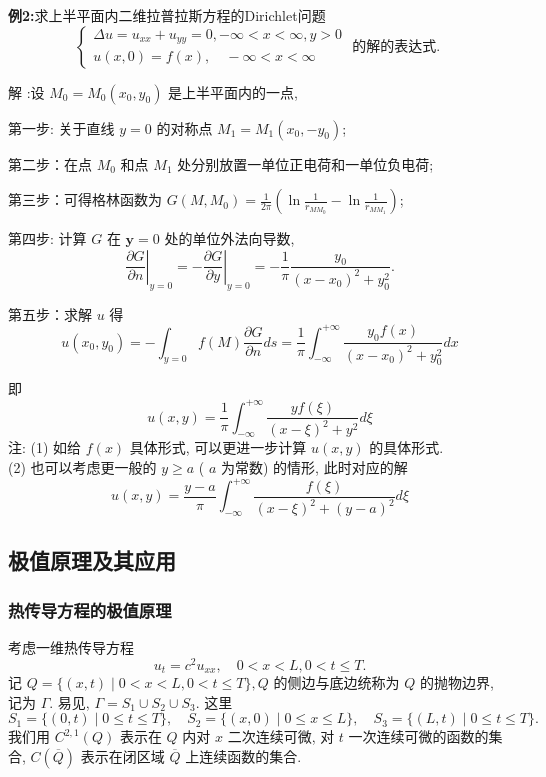 \textbf{例2:}求上半平面内二维拉普拉斯方程的Dirichlet问题
$$
\left\{\begin{array}{c}
\Delta u=u_{x x}+u_{y y}=0,-\infty<x<\infty, y>0 \\
{u}({x}, {0})={f}({x}), \quad-\infty<x<\infty
\end{array}\right. \text { 的解的表达式. }
$$

解 :设 $ M_{0}=M_{0}\left(x_{0}, y_{0}\right) $ 是上半平面内的一点,

第一步: 关于直线 $ y=0 $ 的对称点 $ M_{1}=M_{1}\left(x_{0},-y_{0}\right) $;

第二步：在点 $ M_{0} $ 和点 $ M_{1} $ 处分别放置一单位正电荷和一单位负电荷;

第三步：可得格林函数为 $ G\left(M, M_{0}\right)=\frac{1}{2 \pi}\left(\ln \frac{1}{r_{M M_{0}}}-\ln \frac{1}{r_{M M_{1}}}\right) $;

第四步: 计算 $ G $ 在 $ \boldsymbol{y}=0 $ 处的单位外法向导数,
$$
\left.\frac{\partial G}{\partial n}\right|_{y=0}=-\left.\frac{\partial G}{\partial y}\right|_{y=0}=-\frac{1}{\pi} \frac{y_{0}}{\left(x-x_{0}\right)^{2}+y_{0}^{2}} .
$$

第五步：求解 $ u $ 得
$$
u\left(x_{0}, y_{0}\right)=-\int_{y=0} f(M) \frac{\partial G}{\partial n} d s=\frac{1}{\pi} \int_{-\infty}^{+\infty} \frac{y_{0} f(x)}{\left(x-x_{0}\right)^{2}+y_{0}^{2}} d x
$$

即 $$ u(x, y)=\frac{1}{\pi} \int_{-\infty}^{+\infty} \frac{y f(\xi)}{(x-\xi)^{2}+y^{2}} d \xi $$
注: (1) 如给 $ f(x) $ 具体形式, 可以更进一步计算 $ u(x, y) $ 的具体形式.\\
(2)  也可以考虑更一般的 $ y \geq a $ ( $ a $ 为常数) 的情形, 此时对应的解
$$
u(x, y)=\frac{y-a}{\pi} \int_{-\infty}^{+\infty} \frac{f(\xi)}{(x-\xi)^{2}+(y-a)^{2}} d \xi
$$

\subsection{极值原理及其应用}
\subsubsection{热传导方程的极值原理}
考虑一维热传导方程
\begin{equation*}
    u_{t}=c^{2} u_{x x}, \quad 0<x<L, 0<t \leqslant T .\tag{1}
\end{equation*}
记 $ Q=\{(x, t) \mid 0<x<L, 0<t \leqslant T\}, Q $ 的侧边与底边统称为 $ Q $ 的抛物边界, 记为 $ \Gamma $. 易见, $ \Gamma=S_{1} \cup S_{2} \cup S_{3} $.
这里
$$
S_{1}=\{(0, t) \mid 0 \leqslant t \leqslant T\}, \quad S_{2}=\{(x, 0) \mid 0 \leqslant x \leqslant L\}, \quad S_{3}=\{(L, t) \mid 0 \leqslant t \leqslant T\} .
$$
我们用 $ C^{2,1}(Q) $ 表示在 $ Q $ 内对 $ x $ 二次连续可微, 对 $ t $ 一次连续可微的函数的集合, $ C(\overline{Q}) $ 表示在闭区域 $ \overline{Q} $ 上连续函数的集合.

